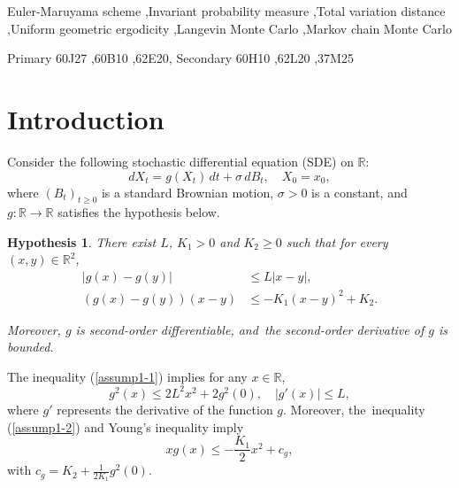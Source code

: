 \documentclass[11pt]{elsarticle}
\def\geq{\geqslant}
\def\leq{\leqslant}
\def\R{\mathbb{R}}
\newtheorem{hyp}{Hypothesis}
\begin{document}
\begin{frontmatter}

\begin{keyword}
Euler-Maruyama scheme \sep Invariant probability measure \sep Total variation distance \sep Uniform geometric ergodicity \sep Langevin Monte Carlo \sep Markov chain Monte Carlo


\MSC[2008] Primary 60J27 \sep 60B10 \sep 62E20, Secondary 60H10 \sep 62L20 \sep 37M25

\end{keyword}

\end{frontmatter}
\date{\today}

\section{Introduction}
Consider the following stochastic differential equation (SDE) on $\R$:
\begin{equation}\label{SDE}
	dX_t = g(X_t)\,dt + \sigma\, dB_t,\quad X_0 = x_0,
\end{equation}
where $(B_t)_{t\geq0}$ is a standard Brownian motion, $\sigma>0$ is a constant, and~$g: \R\rightarrow\R$
satisfies the hypothesis below. 
\begin{hyp}\label{hyp1}
	There exist $L$, $K_1 > 0$ and $K_2 \geq 0$ such that for every $(x,y)\in\R^2$,
	\begin{align}
		|g(x)-g(y)| &\leq L|x-y|,\label{assump1-1}\\
		(g(x)-g(y))(x-y)&\leq-K_1(x-y)^2+K_2.\label{assump1-2}
	\end{align}
	
	Moreover, $g$ is second-order differentiable, and~the second-order derivative of $g$ is bounded.
\end{hyp}	

The inequality (\ref{assump1-1}) implies for any $x\in\R$,
\begin{equation}\label{eq-g-square}
	g^2(x)\leq 2L^2x^2+2{g^2(0)},\quad |g'(x)|\leq L,
\end{equation}
where $g'$ represents the derivative of the function $g$.
Moreover, the~inequality (\ref{assump1-2}) and Young's inequality imply
\begin{equation}\label{assump1-3}
	xg(x)\leq -\frac{K_1}{2}x^2+c_g,
\end{equation}
with $c_g=K_2+\frac{1}{2K_1}g^2(0)$.
\end{document}
